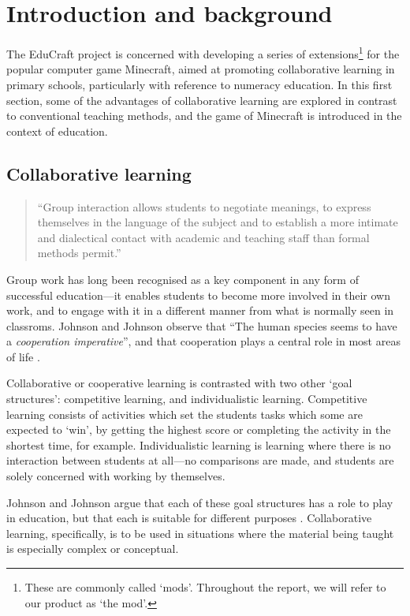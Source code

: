 \chapter{Introduction and background}
The EduCraft project is concerned with developing a series of
extensions\footnote{These are commonly called `mods'. Throughout the report, 
we will refer to our product as `the mod'.} for the popular computer game
Minecraft, aimed at promoting collaborative learning in primary schools,
particularly with reference to numeracy education. In this first section, some
of the advantages of collaborative learning are explored in contrast to
conventional teaching methods, and the game of Minecraft is introduced in the
context of education.

\section{Collaborative learning}
\begin{quote}
``Group interaction allows students to negotiate meanings, to express
themselves in the language of the subject and to establish a more intimate
and dialectical contact with academic and teaching staff than formal
methods permit.'' \cite[p.~1]{jacques00}
\end{quote}
Group work has long been recognised as a key component in any form of
successful education---it enables students to become more involved in their
own work, and to engage with it in a different manner from what is normally
seen in classroms. Johnson and Johnson observe that ``The human species seems
to have a \textit{cooperation imperative}'', and that cooperation plays
a central role in most areas of life \cite[p.~12]{johnson94}.

Collaborative or cooperative learning is contrasted with two other `goal
structures': competitive learning, and individualistic learning. Competitive
learning consists of activities which set the students tasks which some
are expected to `win', by getting the highest score or completing the activity
in the shortest time, for example. Individualistic learning is learning where
there is no interaction between students at all---no comparisons are made,
and students are solely concerned with working by themselves.

Johnson and Johnson argue that each of these goal structures has a role
to play in education, but that each is suitable for different
purposes \cite{johnson94}.  Collaborative learning, specifically, is to
be used in situations where the material being taught is especially
complex or conceptual.


